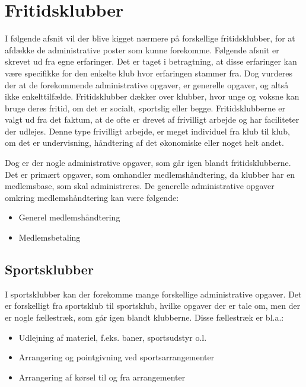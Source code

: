 \chapter{Fritidsklubber} \label{chap:Fritidsklubber}

I følgende afsnit vil der blive kigget nærmere på forskellige fritidsklubber, for at afdække de administrative poster
som kunne forekomme. Følgende afsnit er skrevet ud fra egne erfaringer. Det er taget i betragtning, at disse erfaringer
kan være specifikke for den enkelte klub hvor erfaringen stammer fra. Dog vurderes der at de forekommende administrative
opgaver, er generelle opgaver, og altså ikke enkelttilfælde. Fritidsklubber dækker over klubber, hvor unge og voksne kan
bruge deres fritid, om det er socialt, sportslig eller begge. Fritidsklubberne er valgt ud fra det faktum, at de ofte er
drevet af frivilligt arbejde og har faciliteter der udlejes. Denne type frivilligt arbejde, er meget individuel fra klub
til klub, om det er undervisning, håndtering af det økonomiske eller noget helt andet.

Dog er der nogle administrative opgaver, som går igen blandt fritidsklubberne. Det er primært opgaver, som omhandler medlemshåndtering, da klubber har en medlemsbase, som skal administreres. De generelle administrative opgaver omkring medlemshåndtering kan være følgende:
\begin{itemize}
	\item Generel medlemshåndtering
	\item Medlemsbetaling
\end{itemize}


\section{Sportsklubber} \label{Sportsklubber}

I sportsklubber kan der forekomme mange forskellige administrative opgaver. Det er forskelligt fra sportsklub til sportsklub, hvilke opgaver der er tale om, men der er nogle fællestræk, som går igen blandt klubberne. Disse fællestræk er bl.a.:
\begin{itemize}
	\item Udlejning af materiel, f.eks. baner, sportsudstyr o.l.
	\item Arrangering og pointgivning ved sportsarrangementer
	\item Arrangering af kørsel til og fra arrangementer
\end{itemize}

